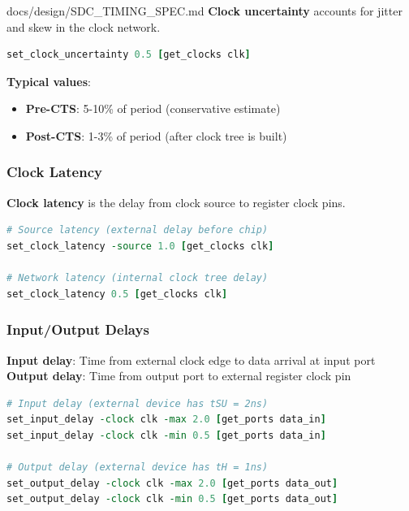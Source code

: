 \begin{relocated}{docs/design/SDC_TIMING_SPEC.md}
\textbf{Clock uncertainty} accounts for jitter and skew in the clock
network.

\begin{lstlisting}[language=tcl]
set_clock_uncertainty 0.5 [get_clocks clk]
\end{lstlisting}

\textbf{Typical values}:

\begin{itemize}
\tightlist
\item
  \textbf{Pre-CTS}: 5-10\% of period (conservative estimate)
\item
  \textbf{Post-CTS}: 1-3\% of period (after clock tree is built)
\end{itemize}

\subsubsection{Clock Latency}\label{ds:ch:sdc-timing-spec:clock-latency}

\textbf{Clock latency} is the delay from clock source to register clock
pins.

\begin{lstlisting}[language=tcl]
# Source latency (external delay before chip)
set_clock_latency -source 1.0 [get_clocks clk]

# Network latency (internal clock tree delay)
set_clock_latency 0.5 [get_clocks clk]
\end{lstlisting}

\subsubsection{\texorpdfstring{Input/\allowbreak{}Output
Delays}{Input/Output Delays}}\label{ds:ch:sdc-timing-spec:inputoutput-delays}

\textbf{Input delay}: Time from external clock edge to data arrival at
input port \textbf{Output delay}: Time from output port to external
register clock pin

\begin{lstlisting}[language=tcl]
# Input delay (external device has tSU = 2ns)
set_input_delay -clock clk -max 2.0 [get_ports data_in]
set_input_delay -clock clk -min 0.5 [get_ports data_in]

# Output delay (external device has tH = 1ns)
set_output_delay -clock clk -max 2.0 [get_ports data_out]
set_output_delay -clock clk -min 0.5 [get_ports data_out]
\end{lstlisting}


\end{relocated}
